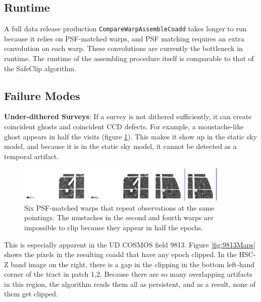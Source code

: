 \documentclass[DM,authoryear,toc]{lsstdoc}
\begin{document}
\subsection{Runtime}
A full data release  production \texttt{CompareWarpAssembleCoadd} takes longer to run because it relies on PSF-matched warps, and PSF matching requires an extra convolution on each warp.
These convolutions are currently the bottleneck in runtime.
The runtime of the assembling procedure itself is comparable to that of the SafeClip algorithm.

\subsection{Failure Modes}

\textbf{Under-dithered Surveys}: If a survey is not dithered sufficiently, it can create coincident ghosts and coincident CCD defects.
For example, a moustache-like ghost appears in half the visits (figure \ref{fig:underdithered}).
This makes it show up in the static sky model, and because it is in the static sky model, it cannot be detected as a temporal artifact.

\begin{figure}
\begin{centering}
\includegraphics[width=0.9\textwidth]{figures/underdithered.png}
\par\end{centering}
\caption{\label{fig:underdithered} Six PSF-matched warps that repeat observations at the same pointings. The mustaches in the second and fourth warps are impossible to clip because they appear in half the epochs.}
\end{figure}

This is especially apparent in the UD COSMOS field 9813.
Figure \ref{fig:9813Maps} shows the pixels in the resulting coadd that have any epoch clipped.
In the HSC-Z band image on the right,  there is a gap in the clipping in the bottom left-hand corner of the tract in patch 1,2.
Because there are so many overlapping artifacts in this region,  the algorithm reads them all as persistent, and as a result, none of them get clipped.
\end{document}

